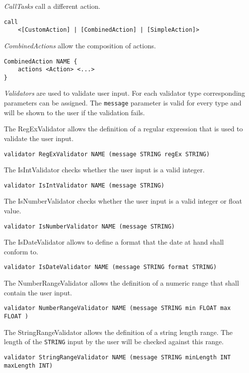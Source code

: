 \textit{CallTasks} call a different action.
\begin{lstlisting}
call
	<[CustomAction] | [CombinedAction] | [SimpleAction]>
\end{lstlisting}

\textit{CombinedActions} allow the composition of actions.
\begin{lstlisting}
CombinedAction NAME {
	actions <Action> <...>
}
\end{lstlisting}

\textit{Validators} are used to validate user input. For each validator type corresponding parameters can be assigned. The \lstinline!message! parameter is valid for every type and will be shown to the user if the validation fails.

The RegExValidator allows the definition of a regular expression that is used to validate the user input.
\begin{lstlisting}
validator RegExValidator NAME (message STRING regEx STRING)
\end{lstlisting}

The IsIntValidator checks whether the user input is a valid integer.
\begin{lstlisting}
validator IsIntValidator NAME (message STRING)
\end{lstlisting}

The IsNumberValidator checks whether the user input is a valid integer or float value.
\begin{lstlisting}
validator IsNumberValidator NAME (message STRING)
\end{lstlisting}

The IsDateValidator allows to define a format that the date at hand shall conform to.
\begin{lstlisting}
validator IsDateValidator NAME (message STRING format STRING)
\end{lstlisting}

The NumberRangeValidator allows the definition of a numeric range that shall contain the user input.
\begin{lstlisting}
validator NumberRangeValidator NAME (message STRING min FLOAT max FLOAT )
\end{lstlisting}

The StringRangeValidator allows the definition of a string length range. The length of the \lstinline!STRING! input by the user will be checked against this range.
\begin{lstlisting}
validator StringRangeValidator NAME (message STRING minLength INT maxLength INT)
\end{lstlisting}

